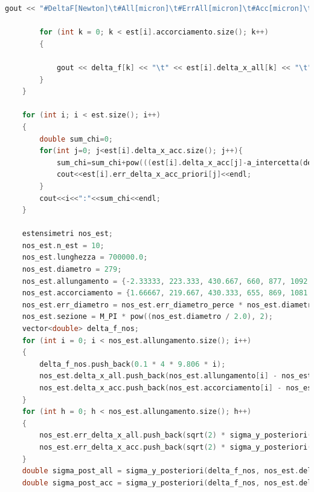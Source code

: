 \documentclass[a4paper,11pt,oneside]{article}
\begin{document}
\begin{lstlisting}[language=C++, label=lst:seconda_parte, caption=seconda\_parte]
		gout << "#DeltaF[Newton]\t#All[micron]\t#ErrAll[micron]\t#Acc[micron]\t#ErrAcc[micron]\tsigma_post_ALL\tsigma_post_ACC" << endl;

		for (int k = 0; k < est[i].accorciamento.size(); k++) 
		{													  

			gout << delta_f[k] << "\t" << est[i].delta_x_all[k] << "\t" << est[i].err_delta_x_all[k] << "\t" << est[i].delta_x_acc[k] << "\t" << est[i].err_delta_x_acc[k] << "\t" << sigma_y_posteriori(delta_f, est[i].delta_x_all) << "\t" << sigma_y_posteriori(delta_f, est[i].delta_x_acc) << endl;
		}
	}
	
	for (int i; i < est.size(); i++)
	{
		double sum_chi=0;
		for(int j=0; j<est[i].delta_x_acc.size(); j++){
			sum_chi=sum_chi+pow(((est[i].delta_x_acc[j]-a_intercetta(delta_f, est[i].delta_x_acc)-(b_angolare(delta_f, est[i].delta_x_acc)*delta_f[j]))/est[i].err_delta_x_acc_priori[j]),2);
			cout<<est[i].err_delta_x_acc_priori[j]<<endl;
		}
		cout<<i<<":"<<sum_chi<<endl;
	}

	estensimetri nos_est; 
	nos_est.n_est = 10;
	nos_est.lunghezza = 700000.0;
	nos_est.diametro = 279;
	nos_est.allungamento = {-2.33333, 223.333, 430.667, 660, 877, 1092, 1310.33, 1512.33, 1748.67, 1948.33, 2170};
	nos_est.accorciamento = {1.66667, 219.667, 430.333, 655, 869, 1081.67, 1303.67, 1513.67, 1727, 1949.67, 2170};
	nos_est.err_diametro = nos_est.err_diametro_perce * nos_est.diametro;
	nos_est.sezione = M_PI * pow((nos_est.diametro / 2.0), 2);
	vector<double> delta_f_nos;
	for (int i = 0; i < nos_est.allungamento.size(); i++)
	{
		delta_f_nos.push_back(0.1 * 4 * 9.806 * i);
		nos_est.delta_x_all.push_back(nos_est.allungamento[i] - nos_est.allungamento[0]);
		nos_est.delta_x_acc.push_back(nos_est.accorciamento[i] - nos_est.accorciamento[0]);
	}
	for (int h = 0; h < nos_est.allungamento.size(); h++)
	{
		nos_est.err_delta_x_all.push_back(sqrt(2) * sigma_y_posteriori(delta_f_nos, nos_est.delta_x_all)); 
		nos_est.err_delta_x_acc.push_back(sqrt(2) * sigma_y_posteriori(delta_f_nos, nos_est.delta_x_all));
	}
	double sigma_post_all = sigma_y_posteriori(delta_f_nos, nos_est.delta_x_all);
	double sigma_post_acc = sigma_y_posteriori(delta_f_nos, nos_est.delta_x_acc);


\end{lstlisting}
\end{document}
